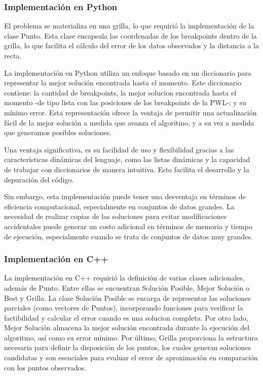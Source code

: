 \documentclass{article}
\begin{document}
        \subsubsection{Implementación en Python}
        El problema se materializa en una grilla, lo que requirió la implementación de la clase Punto. Esta clase encapsula las coordenadas de los breakpoints dentro de la grilla, lo que facilita el cálculo del error de los datos observados y la distancia a la recta.

        La implementación en Python utiliza un enfoque basado en un diccionario para representar la mejor solución encontrada hasta el momento. Este diccionario contiene: la cantidad de breakpoints, la mejor solucion encontrada hasta el momento -de tipo lista con las posiciones de los breakpoints de la PWL-;  y su mínimo error. Esta representación ofrece la ventaja de permitir una actualización fácil de la mejor solución a medida que avanza el algoritmo, y a su vez a medida que generamos posibles soluciones. 
        
        Una ventaja significativa, es su facilidad de uso y flexibilidad gracias a las características dinámicas del lenguaje, como las listas dinámicas y la capacidad de trabajar con diccionarios de manera intuitiva. Esto facilita el desarrollo y la depuración del código.

        Sin embargo, esta implementación puede tener una desventaja en términos de eficiencia computacional, especialmente en conjuntos de datos grandes. La necesidad de realizar copias de las soluciones para evitar modificaciones accidentales puede generar un costo adicional en términos de memoria y tiempo de ejecución, especialmente cuando se trata de conjuntos de datos muy grandes. 

        \subsubsection{Implementación en C++}

        
        La implementación en C++ requirió la definición de varias clases adicionales, además de Punto. Entre ellas se encuentran Solución Posible, Mejor Solución o Best y Grilla. La clase Solución Posible se encarga de representar las soluciones parciales (como vectores de Puntos), incorporando funciones para verificar la factibilidad y calcular el error cuando es una solucion completa. Por otro lado, Mejor Solución almacena la mejor solución encontrada durante la ejecución del algoritmo, así como su error mínimo. Por último, Grilla proporciona la estructura necesaria para definir la disposición de los puntos, los cuales generan soluciones candidatas y son esenciales para evaluar el error de aproximación en comparación con los puntos observados.
        
\end{document}
